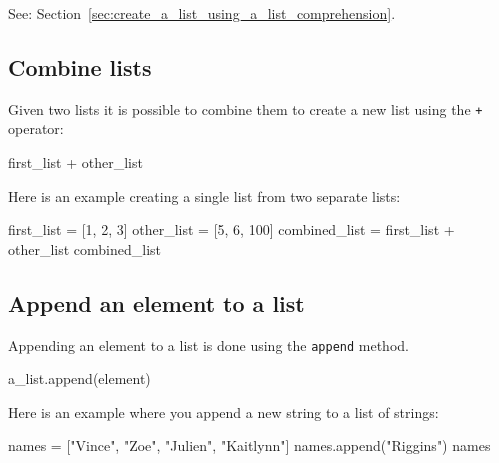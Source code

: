 See: Section~\ref{sec:create_a_list_using_a_list_comprehension}.


\subsection{Combine lists}

Given two lists it is possible to combine them to create a new list using the \texttt{+} operator:


\begin{api}
first_list + other_list
\end{api}



Here is an example creating a single list from two separate lists:




\begin{pyin}
first_list = [1, 2, 3]
other_list = [5, 6, 100]
combined_list = first_list + other_list
combined_list
\end{pyin}





\begin{raw}
[1, 2, 3, 5, 6, 100]
\end{raw}





\subsection{Append an element to a list}

Appending an element to a list is done using the \texttt{append} method.


\begin{api}
a_list.append(element)
\end{api}



Here is an example where you append a new string to a list of strings:




\begin{pyin}
names = ["Vince", "Zoe", "Julien", "Kaitlynn"]
names.append("Riggins")
names
\end{pyin}





\begin{raw}
\end{raw}

